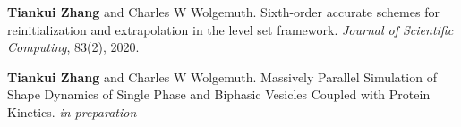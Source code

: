 
\begin{cventries}
  \cventry
    {} %
    {} %
    {} %
    {} %
    {
      \begin{cvitems} %
        \item {\textbf{Tiankui Zhang} and Charles W Wolgemuth. Sixth-order accurate schemes for reinitialization
and extrapolation in the level set framework. \textit{Journal of Scientific Computing}, 83(2), 2020.}
      \end{cvitems}
    }

  \cventry
    {} %
    {} %
    {} %
    {} %
    {
      \begin{cvitems} %
      	\item {\textbf{Tiankui Zhang} and Charles W Wolgemuth. Massively Parallel Simulation of Shape Dynamics of Single Phase and Biphasic Vesicles Coupled with Protein Kinetics. \textit{in preparation}}
      \end{cvitems}
    }
\end{cventries}